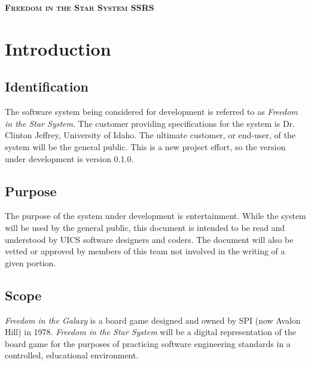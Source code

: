 \documentclass[twoside,letterpaper]{article}
\begin{document}
\clearpage
\begin{minipage}{\linewidth}
\centering
\textsc{
	\textbf{Freedom in the Star System SSRS}}

\vspace{2em}



\end{minipage}

\setcounter{tocdepth}{9}
\renewcommand\contentsname{\centering\textsc{\textbf{Table of Contents}}}
\tableofcontents


\section{Introduction}
\subsection{Identification}

The software system being considered for development is referred to as \textit{Freedom in the Star System}.  The customer providing specifications for the system is Dr. Clinton Jeffrey, University of Idaho.  The ultimate customer, or end-user, of the system will be the general public.  This is a new project effort, so the version under development is version 0.1.0.

\subsection{Purpose}
The purpose of the system under development is entertainment.  While the system will be used by the general public, this document is intended to be read and understood by UICS software
designers and coders. The document will also be vetted or approved by members of this team not involved in the writing of a given portion.

\subsection{Scope}
\textit{Freedom in the Galaxy} is a board game designed and owned by SPI (now Avalon Hill) in 1978.  \textit{Freedom in the Star System} will be a digital representation of the board game for the purposes of practicing software engineering standards in a controlled, educational environment.
\end{document}

